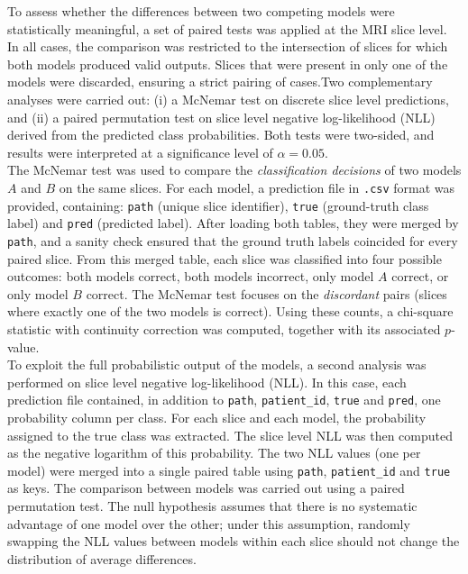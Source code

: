 To assess whether the differences between two competing models were statistically meaningful, a set of paired tests was applied at the MRI slice level. In all cases, the comparison was restricted to the intersection of slices for which both models produced valid outputs. Slices that were present in only one of the models were discarded, ensuring a strict pairing of cases.Two complementary analyses were carried out: (i) a McNemar test on discrete slice level predictions, and (ii) a paired permutation test on slice level negative log-likelihood (NLL) derived from the predicted class probabilities. Both tests were two-sided, and results were interpreted at a significance level of $\alpha = 0.05$.\\


The McNemar test was used to compare the \emph{classification decisions} of two models $A$ and $B$ on the same slices. For each model, a prediction file in \texttt{.csv} format was provided, containing: \texttt{path} (unique slice identifier), \texttt{true} (ground-truth class label) and \texttt{pred} (predicted label). After loading both tables, they were merged by \texttt{path}, and a sanity check ensured that the ground truth labels coincided for every paired slice. From this merged table, each slice was classified into four possible outcomes: both models correct, both models incorrect, only model $A$ correct, or only model $B$ correct. The McNemar test focuses on the \emph{discordant} pairs (slices where exactly one of the two models is correct). Using these counts, a chi-square statistic with continuity correction was computed, together with its associated $p$-value.\\


To exploit the full probabilistic output of the models, a second analysis was performed on slice level negative log-likelihood (NLL). In this case, each prediction file contained, in addition to \texttt{path}, \texttt{patient\_id}, \texttt{true} and \texttt{pred}, one probability column per class. For each slice and each model, the probability assigned to the true class was extracted. The slice level NLL was then computed as the negative logarithm of this probability. The two NLL values (one per model) were merged into a single paired table using \texttt{path}, \texttt{patient\_id} and \texttt{true} as keys. The comparison between models was carried out using a paired permutation test. The null hypothesis assumes that there is no systematic advantage of one model over the other; under this assumption, randomly swapping the NLL values between models within each slice should not change the distribution of average differences.\\

